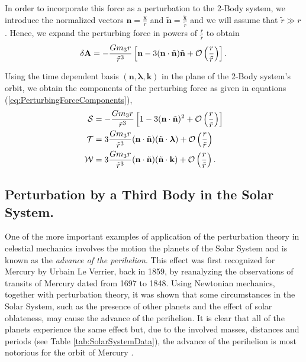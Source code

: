 In order to incorporate this force as a perturbation to the 2-Body system, we introduce the normalized vectors $\textbf{n} = \frac{\textbf{x}}{r}$ and $\tilde{ \textbf{n}} = \frac{\tilde{ \textbf{x}}}{\tilde{r}}$ and we will assume that $\tilde{r} \gg r$. Hence, we expand the perturbing force in powers of $\frac{r}{\tilde{r}}$ to obtain
\begin{equation}
\delta \textbf{A} = - \frac{Gm_3 r}{\tilde{r}^3} \left[ \textbf{n} - 3 (\textbf{n} \cdot \tilde{\textbf{n}}) \tilde{\textbf{n}} + {\mathcal{O}} \left( {\frac{r}{\tilde{r}}} \right) \right]. 
\end{equation}

Using the time dependent basis $(\textbf{n}, \boldsymbol{\lambda}, \textbf{k})$ in the plane of the 2-Body system's orbit, we obtain the components of the perturbing force as given in equations (\ref{eq:PerturbingForceComponents}),
\begin{subequations} \label{eq:PerturbingForceComponentsApprox}
\begin{align}
\mathcal{S} &= - \frac{Gm_3 r}{\tilde{r}^3} \left[ 1- 3 (\textbf{n} \cdot \tilde{\textbf{n}})^2 + {\mathcal{O}} \left( {\frac{r}{\tilde{r}}} \right) \right] \\
\mathcal{T} &= 3 \frac{Gm_3 r}{\tilde{r}^3}  (\textbf{n} \cdot \tilde{\textbf{n}}) (\tilde{\textbf{n}} \cdot \boldsymbol{\lambda} ) + {\mathcal{O}} \left( {\frac{r}{\tilde{r}}} \right) \\
\mathcal{W} &= 3 \frac{Gm_3 r}{\tilde{r}^3}  (\textbf{n} \cdot \tilde{\textbf{n}}) (\tilde{\textbf{n}} \cdot \textbf{k} ) + {\mathcal{O}} \left( {\frac{r}{\tilde{r}}} \right).
\end{align}
\end{subequations}  

\subsection{Perturbation by a Third Body in the Solar System. }

One of the more important examples of application of the perturbation theory in celestial mechanics involves the motion the planets of the Solar System and is known as the \textit{advance of the perihelion}. This effect was first recognized for Mercury by Urbain Le Verrier, back in 1859, by reanalyzing the observations of transits of Mercury dated from 1697 to 1848. Using Newtonian mechanics, together with perturbation theory, it was shown that some circumstances in the Solar System, such as the presence of other planets and the effect of solar oblateness, may cause the advance of the perihelion. It is clear that all of the planets experience the same effect but, due to the involved masses, distances and periods (see Table \ref{tab:SolarSystemData}), the advance of the perihelion is most notorious for the orbit of Mercury \cite{Clemence1947}.
  
